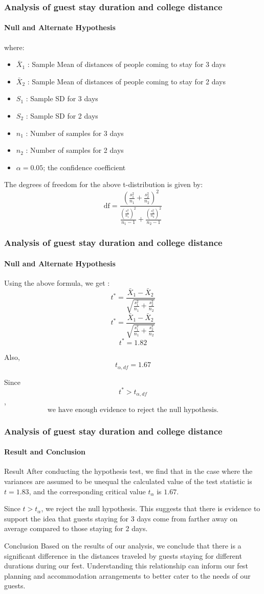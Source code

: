 \documentclass{beamer}
\begin{document}
\begin{frame}
\frametitle{Analysis of guest stay duration and college distance}
\framesubtitle{Null and Alternate Hypothesis}
where:
\begin{itemize}
    \item $\bar{X}_1$ : Sample Mean of distances of people coming to stay for 3 days
    \item $\bar{X}_2$ : Sample Mean of distances of people coming to stay for 2 days
    \item $S_1$ : Sample SD for 3 days
    \item $S_2$ : Sample SD for 2 days
    \item $n_1$ : Number of samples for 3 days 
    \item $n_2$ : Number of samples for 2 days
    \item $\alpha = 0.05$; the confidence coefficient
\end{itemize}

The degrees of freedom for the above t-distribution is given by:
\[ \text{df} = \frac{\left(\frac{s_1^2}{n_1} + \frac{s_2^2}{n_2}\right)^2}{\frac{\left(\frac{s_1^2}{n_1}\right)^2}{n_1 - 1} + \frac{\left(\frac{s_2^2}{n_2}\right)^2}{n_2 - 1}} \]
\end{frame}

\begin{frame}
\frametitle{Analysis of guest stay duration and college distance}
\framesubtitle{Null and Alternate Hypothesis}
\large Using the above formula, we get :
\[ t^* = \frac{\bar{X}_1 - \bar{X}_2}{\sqrt{\frac{s_1^2}{n_1} + \frac{s_2^2}{n_2}}} \]
\[ t^* = \frac{\bar{X}_1 - \bar{X}_2}{\sqrt{\frac{s_1^2}{n_1} + \frac{s_2^2}{n_2}}} \]
\[ t^* = 1.82\]

Also,
\[t_{\alpha, df} = 1.67\] 

Since 
\[ t^* > t_{\alpha, df}\],
\[\text{we have enough evidence to reject the null hypothesis.}\]
\end{frame}

\begin{frame}
\frametitle{Analysis of guest stay duration and college distance}
\framesubtitle{Result and Conclusion}
\begin{block}{Result}
After conducting the hypothesis test, we find that in the case where the variances are assumed to be unequal the calculated value of the test statistic is $t = 1.83$, and the corresponding critical value $t_{\alpha}$ is $1.67$. 

Since $t > t_{\alpha}$, we reject the null hypothesis. This suggests that there is evidence to support the idea that guests staying for 3 days come from farther away on average compared to those staying for 2 days.
\end{block}

\begin{block}{Conclusion}
Based on the results of our analysis, we conclude that there is a significant difference in the distances traveled by guests staying for different durations during our fest. Understanding this relationship can inform our fest planning and accommodation arrangements to better cater to the needs of our guests.
\end{block}
\end{frame}
\end{document}
